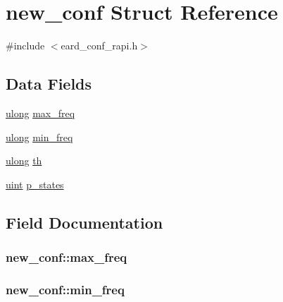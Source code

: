 \hypertarget{structnew__conf}{}\section{new\+\_\+conf Struct Reference}
\label{structnew__conf}


{\ttfamily \#include $<$eard\+\_\+conf\+\_\+rapi.\+h$>$}

\subsection*{Data Fields}
\begin{DoxyCompactItemize}
\item 
\hyperlink{generic_8h_a718b4eb2652c286f4d42dc18a8e71a1a}{ulong} \hyperlink{structnew__conf_aa339cc6a97132e9bc830366209b00229}{max\+\_\+freq}
\item 
\hyperlink{generic_8h_a718b4eb2652c286f4d42dc18a8e71a1a}{ulong} \hyperlink{structnew__conf_ae9e0968f736fe2558a9d30fecc7fdb99}{min\+\_\+freq}
\item 
\hyperlink{generic_8h_a718b4eb2652c286f4d42dc18a8e71a1a}{ulong} \hyperlink{structnew__conf_a7d58694fafbd9cb652e3ab4a82b7086a}{th}
\item 
\hyperlink{generic_8h_a91ad9478d81a7aaf2593e8d9c3d06a14}{uint} \hyperlink{structnew__conf_acf3eef39107cf56589d1b891e07db17c}{p\+\_\+states}
\end{DoxyCompactItemize}


\subsection{Field Documentation}
\subsubsection[{\texorpdfstring{max\+\_\+freq}{max_freq}}]{ new\+\_\+conf\+::max\+\_\+freq}\hypertarget{structnew__conf_aa339cc6a97132e9bc830366209b00229}{}\label{structnew__conf_aa339cc6a97132e9bc830366209b00229}
\subsubsection[{\texorpdfstring{min\+\_\+freq}{min_freq}}]{ new\+\_\+conf\+::min\+\_\+freq}\hypertarget{structnew__conf_ae9e0968f736fe2558a9d30fecc7fdb99}{}\label{structnew__conf_ae9e0968f736fe2558a9d30fecc7fdb99}
